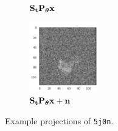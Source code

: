 \begin{figure}[ht!]
\begin{minipage}[b]{0.45\linewidth}
\begin{subfigure}[b]{0.49\linewidth}
            \caption{$\mathbf{S}_{\mathbf{t}} \mathbf{P}_{{\boldsymbol{\theta}}} \mathbf{x}$}
        \end{subfigure}
        \hfill
        \begin{subfigure}[b]{0.49\linewidth}
            \centering
            \includegraphics[height=3cm]{figures/5j0n_noise16_translated}
            \caption{$\mathbf{S}_{\mathbf{t}} \mathbf{P}_{{\boldsymbol{\theta}}} \mathbf{x} + \mathbf{n}$}
        \end{subfigure}
        \caption{%
            Example projections of \texttt{5j0n}.
        }\label{fig:different-projections}
    \end{minipage}
\end{figure}

